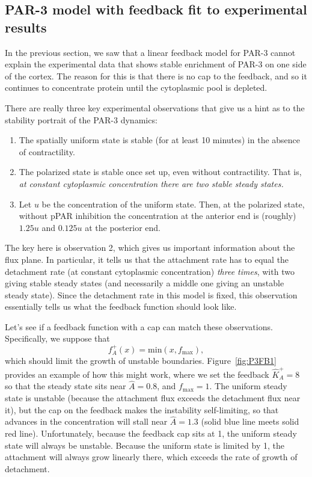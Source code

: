 \documentclass[11pt]{article}
\newcommand{\6}[1]{#1_{\text{6}}}
\newcommand{\3}[1]{#1_{\text{3}}}
\begin{document}
\subsection{PAR-3 model with feedback fit to experimental results}
In the previous section, we saw that a linear feedback model for PAR-3 cannot explain the experimental data that shows stable enrichment of PAR-3 on one side of the cortex. The reason for this is that there is no cap to the feedback, and so it continues to concentrate protein until the cytoplasmic pool is depleted. 

There are really three key experimental observations that give us a hint as to the stability portrait of the PAR-3 dynamics: 
\begin{enumerate}
\item The spatially uniform state is stable (for at least 10 minutes) in the absence of contractility. 
\item The polarized state is stable once set up, even without contractility. That is, \emph{at constant cytoplasmic concentration there are two stable steady states.}
\item Let $u$ be the concentration of the uniform state. Then, at the polarized state, without pPAR inhibition the concentration at the anterior end is (roughly) $1.25u$ and $0.125u$ at the posterior end. 
\end{enumerate}
The key here is observation 2, which gives us important information about the flux plane. In particular, it tells us that the attachment rate has to equal the detachment rate (at constant cytoplasmic concentration) \emph{three times}, with two giving stable steady states (and necessarily a middle one giving an unstable steady state). Since the detachment rate in this model is fixed, this observation essentially tells us what the feedback function should look like. 

Let's see if a feedback function with a cap can match these observations. Specifically, we suppose that $$f_A^+(x)=\text{min}\left(x,f_\text{max}\right),$$ which should limit the growth of unstable boundaries. Figure\ \ref{fig:P3FB1} provides an example of how this might work, where we set the feedback $\hat K_A^+=8$ so that the steady state sits near $\hat A = 0.8$, and $f_\text{max}=1$. The uniform steady state is unstable (because the attachment flux exceeds the detachment flux near it), but the cap on the feedback makes the instability self-limiting, so that advances in the concentration will stall near $\hat A=1.3$ (solid blue line meets solid red line). Unfortunately, because the feedback cap sits at 1, the uniform steady state will always be unstable. Because the uniform state is limited by 1, the attachment will always grow linearly there, which exceeds the rate of growth of detachment. 
\end{document}
